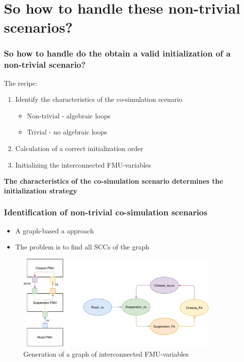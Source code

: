\documentclass{beamer}
\begin{document}
\section{So how to handle these non-trivial scenarios?}
\begin{frame}
\frametitle{So how to handle do the obtain a valid initialization of a non-trivial scenario?}
The recipe:
\begin{enumerate}[I]
    \item Identify the characteristics of the co-simulation scenario
    \begin{itemize}
        \item Non-trivial - algebraic loops
        \item Trivial - no algebraic loops
    \end{itemize}
    \item Calculation of a correct initialization order
    \item Initializing the interconnected FMU-variables
\end{enumerate}

\textbf{The characteristics of the co-simulation scenario determines the initialization strategy}
\end{frame}

\begin{frame}
\frametitle{Identification of non-trivial co-simulation scenarios}
\begin{itemize}
    \item A graph-based a approach 
    \item The problem is to find all SCCs of the graph
\end{itemize}
\begin{figure}
    \centering
    \includegraphics[width=0.9\textwidth]{images/quarter_car-graph.pdf}
    \caption{Generation of a graph of interconnected FMU-variables}
\end{figure}
\end{frame}
\end{document}
